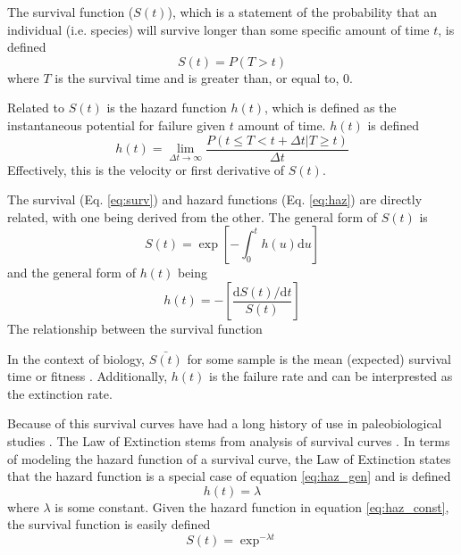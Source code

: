 \documentclass[12pt,letterpaper]{article}
\begin{document}
The survival function (\(S(t)\)), which is a statement of the probability that an individual (i.e. species) will survive longer than some specific amount of time \(t\), is defined
\begin{equation}
  S(t) = P(T > t)
  \label{eq:surv}
\end{equation}
where \(T\) is the survival time and is greater than, or equal to, 0.

Related to \(S(t)\) is the hazard function \(h(t)\), which is defined as the instantaneous potential for failure given \(t\) amount of time. \(h(t)\) is defined 
\begin{equation}
  h(t) = \lim_{\Delta t \to \infty} \frac{P(t \le T < t + \Delta t | T \ge t)}{\Delta t}
  \label{eq:haz}
\end{equation}
Effectively, this is the velocity or first derivative of \(S(t)\).

The survival (Eq. \ref{eq:surv}) and hazard functions (Eq. \ref{eq:haz}) are directly related, with one being derived from the other. The general form of \(S(t)\) is
\begin{equation}
  S(t) = \exp\left[- \int_{0}^{t} h(u) \mathrm{d}u\right]
  \label{eq:surv_gen}
\end{equation}
and the general form of \(h(t)\) being
\begin{equation}
  h(t) = -\left[\frac{\mathrm{d}S(t) / \mathrm{d}t}{S(t)}\right]
  \label{eq:haz_gen}
\end{equation}
The relationship between the survival function 

In the context of biology, \(\bar{S(t)}\) for some sample is the mean (expected) survival time or fitness \citep{Cooper1984}. Additionally, \(h(t)\) is the failure rate and can be interprested as the extinction rate. 

Because of this survival curves have had a long history of use in paleobiological studies \citep{Simpson1953,VanValen1973,Levinton1974,Raup1975,Raup1978,Foote1988,Kitchell1991,Foote2001}. The Law of Extinction stems from analysis of survival curves \citep{VanValen1973}. In terms of modeling the hazard function of a survival curve, the Law of Extinction states that the hazard function is a special case of equation \ref{eq:haz_gen} and is defined 
\begin{equation}
  h(t) = \lambda
  \label{eq:haz_const}
\end{equation}
where \(\lambda\) is some constant. Given the hazard function in equation \ref{eq:haz_const}, the survival function is easily defined 
\begin{equation}
  S(t) = \exp^{-\lambda t}
  \label{eq:surv_const}
\end{equation}
\end{document}
